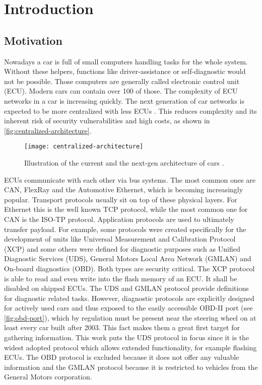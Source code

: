 \section{Introduction}
\label{sec:introduction}

\subsection{Motivation}
Nowadays a car is full of small computers handling tasks for the whole system. Without these helpers, functions like driver-assistance or self-diagnostic would not be possible. Those computers are generally called electronic control unit (ECU). Modern cars can contain over 100 of those. The complexity of ECU networks in a car is increasing quickly. The next generation of car networks is expected to be more centralized with less ECUs \cite{car-architecture}. This reduces complexity and its inherent risk of security vulnerabilities and high costs, as shown in \autoref{fig:centralized-architecture}.

\begin{figure}[h]
    \centering
    \texttt{[image: centralized-architecture]}
    \caption{Illustration of the current and the next-gen architecture of cars \cite{car-architecture}.}
    \label{fig:centralized-architecture}
\end{figure}

ECUs communicate with each other via bus systems. The most common ones are CAN, FlexRay and the Automotive Ethernet, which is becoming increasingly popular. Transport protocols usually sit on top of these physical layers. For Ethernet this is the well known TCP protocol, while the most common one for CAN is the ISO-TP protocol. Application protocols are used to ultimately transfer payload. For example, some protocols were created specifically for the development of units like Universal Measurement and Calibration Protocol (XCP) and some others were defined for diagnostic purposes such as Unified Diagnostic Services (UDS), General Motors Local Area Network (GMLAN) and On-board diagnostics (OBD). Both types are security critical. The XCP protocol is able to read and even write into the flash memory of an ECU. It shall be disabled on shipped ECUs. The UDS and GMLAN protocol provide definitions for diagnostic related tasks. However, diagnostic protocols are explicitly designed for actively used cars and thus exposed to the easily accessible OBD-II port (see \autoref{fig:obd-port}), which by regulation must be present near the steering wheel on at least every car built after 2003. This fact makes them a great first target for gathering information. This work puts the UDS protocol in focus since it is the widest adopted protocol which allows extended functionality, for example flashing ECUs. The OBD protocol is excluded because it does not offer any valuable information and the GMLAN protocol because it is restricted to vehicles from the General Motors corporation.

